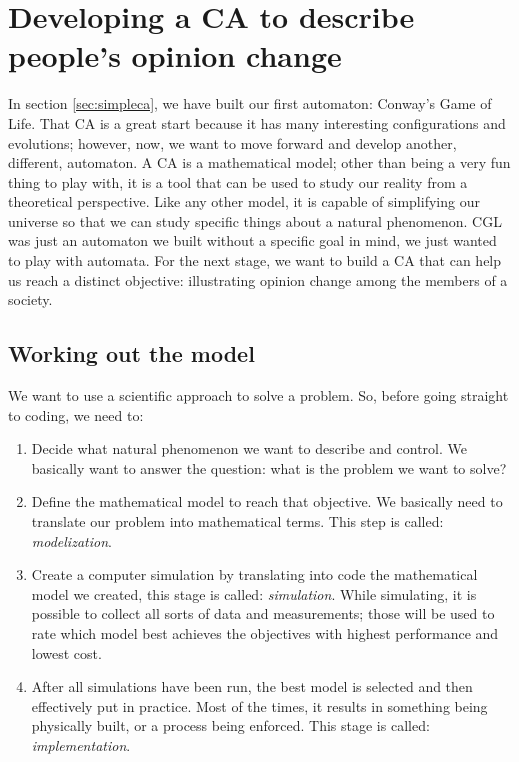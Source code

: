 
\section{Developing a CA to describe people's opinion change}
\label{sec:opinionca}

In section \ref{sec:simpleca}, we have built our first automaton: Conway's Game of Life.
That CA is a great start because it has many interesting configurations and evolutions;
however, now, we want to move forward and develop another, different, automaton.
A CA is a mathematical model; other than being a very fun thing to play with, it is a
tool that can be used to study our reality from a theoretical perspective. Like any other
model, it is capable of simplifying our universe so that we can study specific things
about a natural phenomenon. CGL was just an automaton we built without a specific goal
in mind, we just wanted to play with automata.
For the next stage, we want to build a CA that can help us reach a distinct objective:
illustrating opinion change among the members of a society.

\subsection{Working out the model}
We want to use a scientific approach to solve a problem. So, 
before going straight to coding, we need to:

\begin{enumerate}
\item Decide what natural phenomenon we want to describe and control. 
We basically want to answer the question: what is the problem we want to solve?
\item Define the mathematical model to reach that objective. We 
basically need to translate
our problem into mathematical terms. This step is called: \textit{modelization}.
\item Create a computer simulation by translating into code the mathematical
model we created, this stage is called: \textit{simulation}. While simulating,
it is possible to collect all sorts of data and measurements; those will be used
to rate which model best achieves the objectives with highest performance and
lowest cost.
\item After all simulations have been run, the best model is selected and then
effectively put in practice. Most of the times, it results in something being
physically built, or a process being enforced. This stage is called:
\textit{implementation}.
\end{enumerate}

